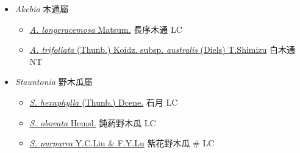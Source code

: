
  \begin{itemize}
 \item[] \textit{Akebia} 木通屬
                                
  \begin{itemize}
        \item[] \href{http://www.theplantlist.org/tpl1.1/search?q=Akebia+longeracemosa}{\textit{A. longeracemosa} Matsum.}   長序木通   LC
        \item[] \href{http://www.theplantlist.org/tpl1.1/search?q=Akebia+trifoliata+subsp.+australis}{\textit{A. trifoliata} (Thunb.) Koidz. subsp. \textit{australis} (Diels) T.Shimizu}   白木通   NT
  \end{itemize}
 \item[] \textit{Stauntonia} 野木瓜屬
                                
  \begin{itemize}
        \item[] \href{http://www.theplantlist.org/tpl1.1/search?q=Stauntonia+hexaphylla}{\textit{S. hexaphylla} (Thunb.) Dcene.}   石月   LC
        \item[] \href{http://www.theplantlist.org/tpl1.1/search?q=Stauntonia+obovata}{\textit{S. obovata} Hemsl.}   鈍葯野木瓜   LC
        \item[] \href{http://www.theplantlist.org/tpl1.1/search?q=Stauntonia+purpurea}{\textit{S. purpurea} Y.C.Liu \& F.Y.Lu}   紫花野木瓜  \# LC
  \end{itemize}
  \end{itemize}

